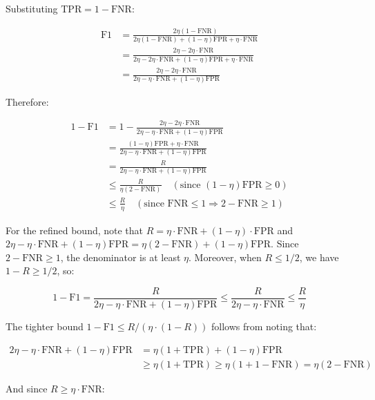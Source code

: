 \documentclass[
  12pt,
]{ctexart}
\begin{document}
Substituting \(\text{TPR} = 1 - \text{FNR}\):

\[\begin{aligned}
\text{F1} &= \frac{2\eta(1 - \text{FNR})}{2\eta(1 - \text{FNR}) + (1-\eta)\text{FPR} + \eta \cdot \text{FNR}} \\
&= \frac{2\eta - 2\eta\cdot\text{FNR}}{2\eta - 2\eta\cdot\text{FNR} + (1-\eta)\text{FPR} + \eta\cdot\text{FNR}} \\
&= \frac{2\eta - 2\eta\cdot\text{FNR}}{2\eta - \eta\cdot\text{FNR} + (1-\eta)\text{FPR}}
\end{aligned}\]

Therefore:

\[\begin{aligned}
1 - \text{F1} &= 1 - \frac{2\eta - 2\eta\cdot\text{FNR}}{2\eta - \eta\cdot\text{FNR} + (1-\eta)\text{FPR}} \\
&= \frac{(1-\eta)\text{FPR} + \eta\cdot\text{FNR}}{2\eta - \eta\cdot\text{FNR} + (1-\eta)\text{FPR}} \\
&= \frac{R}{2\eta - \eta\cdot\text{FNR} + (1-\eta)\text{FPR}} \\
&\leq \frac{R}{\eta(2 - \text{FNR})} \quad (\text{since } (1-\eta)\text{FPR} \geq 0) \\
&\leq \frac{R}{\eta} \quad (\text{since } \text{FNR} \leq 1 \Rightarrow 2 - \text{FNR} \geq 1)
\end{aligned}\]

For the refined bound, note that
\(R = \eta \cdot \text{FNR} + (1-\eta) \cdot \text{FPR}\) and
\(2\eta - \eta\cdot\text{FNR} + (1-\eta)\text{FPR} = \eta(2 - \text{FNR}) + (1-\eta)\text{FPR}\).
Since \(2 - \text{FNR} \geq 1\), the denominator is at least \(\eta\).
Moreover, when \(R \leq 1/2\), we have \(1 - R \geq 1/2\), so:

\[1 - \text{F1} = \frac{R}{2\eta - \eta\cdot\text{FNR} + (1-\eta)\text{FPR}} \leq \frac{R}{2\eta - \eta\cdot\text{FNR}} \leq \frac{R}{\eta}\]

The tighter bound \(1 - \text{F1} \leq R/(\eta \cdot (1 - R))\) follows
from noting that:

\[\begin{aligned}
2\eta - \eta\cdot\text{FNR} + (1-\eta)\text{FPR}
&= \eta(1 + \text{TPR}) + (1-\eta)\text{FPR} \\
&\geq \eta(1 + \text{TPR}) \geq \eta(1 + 1 - \text{FNR}) = \eta(2 - \text{FNR})
\end{aligned}\]

And since \(R \geq \eta \cdot \text{FNR}\):
\end{document}

